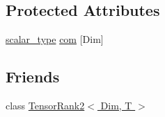 \subsection*{Protected Attributes}
\begin{DoxyCompactItemize}
\item 
\hyperlink{classcofe_1_1TensorRank1_a10a89d234fbdb6695e1da39745f998c6}{scalar\-\_\-type} \hyperlink{classcofe_1_1TensorRank1_abdb5cad4f516b76641384b815b2c6c66}{com} \mbox{[}Dim\mbox{]}
\end{DoxyCompactItemize}
\subsection*{Friends}
\begin{DoxyCompactItemize}
\item 
class \hyperlink{classcofe_1_1TensorRank1_a99d6c8ee5a264ecaac00ed0cece3ed03}{Tensor\-Rank2$<$ Dim, T $>$}
\end{DoxyCompactItemize}



